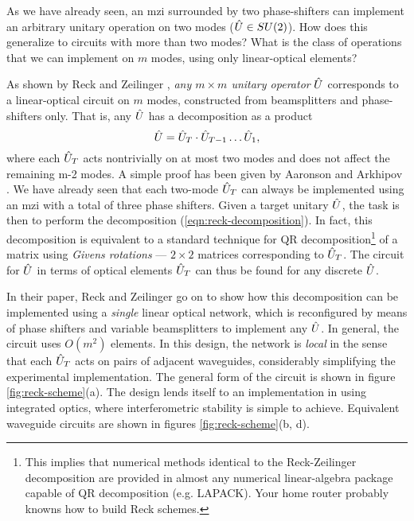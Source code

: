 As we have already seen, an \gls{mzi} surrounded by two phase-shifters can implement an arbitrary unitary operation on two modes ($\hat{U} \in SU(2)$).  
How does this generalize to circuits with more than two modes? What is the class of operations that we can implement on $m$ modes, using only linear-optical elements?

As shown by Reck and Zeilinger \cite{Reck1994}, \emph{any $m \times m$ unitary operator} $\hat{U}$ corresponds to a linear-optical circuit on $m$ modes, constructed from beamsplitters and phase-shifters only. That is, any $\hat{U}$ has a decomposition as a product 
\begin{equation}
    \hat{U} = \hat{U}_T \cdot \hat{U}_{T-1} \ldots \hat{U}_1,
\label{eqn:reck-decomposition}
\end{equation}
where each $\hat{U}_T$ acts nontrivially on at most two modes and does not affect the remaining m-2 modes.  A simple proof has been given by Aaronson and Arkhipov \cite{Aaronson2010a}.  We have already seen that each two-mode $\hat{U}_T$ can always be implemented using an \gls{mzi} with a total of three phase shifters. Given a target unitary $\hat{U}$, the task is then to perform the decomposition (\ref{eqn:reck-decomposition}).  In fact, this decomposition is equivalent to a standard technique for QR decomposition\footnote{This implies that numerical methods identical to the Reck-Zeilinger decomposition are provided in almost any numerical linear-algebra package capable of QR decomposition (e.g. LAPACK). Your home router probably knowns how to build Reck schemes.}
of a matrix using \emph{Givens rotations} --- $2\times2$ matrices corresponding to $\hat{U}_T$. The circuit for $\hat{U}$ in terms of optical elements $\hat{U}_T$ can thus be found for any discrete $\hat{U}$.

In their paper, Reck and Zeilinger go on to show how this decomposition can be implemented using a \emph{single} linear optical network, which is reconfigured by means of phase shifters and variable beamsplitters to implement any $\hat{U}$.  In general, the circuit uses $O(m^2)$ elements. In this design, the network is \emph{local} in the sense that each $\hat{U}_T$ acts on pairs of adjacent waveguides, considerably simplifying the experimental implementation. The general form of the circuit is shown in figure \ref{fig:reck-scheme}(a). The design lends itself to an implementation in using integrated optics, where interferometric stability is simple to achieve. Equivalent waveguide circuits are shown in figures \ref{fig:reck-scheme}(b, d). 

